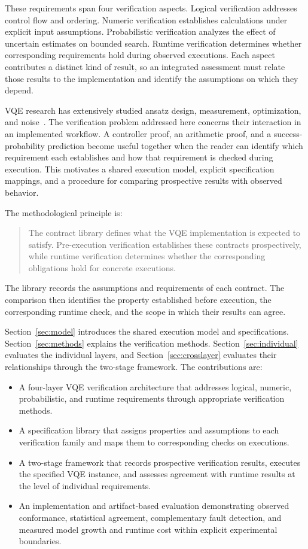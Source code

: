 \documentclass[conference]{IEEEtran}
\begin{document}
These requirements span four verification aspects. Logical verification addresses control flow and ordering. Numeric verification establishes calculations under explicit input assumptions. Probabilistic verification analyzes the effect of uncertain estimates on bounded search. Runtime verification determines whether corresponding requirements hold during observed executions. Each aspect contributes a distinct kind of result, so an integrated assessment must relate those results to the implementation and identify the assumptions on which they depend.

VQE research has extensively studied ansatz design, measurement, optimization, and noise~\cite{tilly2022}. The verification problem addressed here concerns their interaction in an implemented workflow. A controller proof, an arithmetic proof, and a success-probability prediction become useful together when the reader can identify which requirement each establishes and how that requirement is checked during execution. This motivates a shared execution model, explicit specification mappings, and a procedure for comparing prospective results with observed behavior.

The methodological principle is:
\begin{quote}
The contract library defines what the VQE implementation is expected to satisfy. Pre-execution verification establishes these contracts prospectively, while runtime verification determines whether the corresponding obligations hold for concrete executions.
\end{quote}
The library records the assumptions and requirements of each contract. The comparison then identifies the property established before execution, the corresponding runtime check, and the scope in which their results can agree.

Section~\ref{sec:model} introduces the shared execution model and specifications. Section~\ref{sec:methods} explains the verification methods. Section~\ref{sec:individual} evaluates the individual layers, and Section~\ref{sec:crosslayer} evaluates their relationships through the two-stage framework. The contributions are:
\begin{itemize}
\item A four-layer VQE verification architecture that addresses logical, numeric, probabilistic, and runtime requirements through appropriate verification methods.
\item A specification library that assigns properties and assumptions to each verification family and maps them to corresponding checks on executions.
\item A two-stage framework that records prospective verification results, executes the specified VQE instance, and assesses agreement with runtime results at the level of individual requirements.
\item An implementation and artifact-based evaluation demonstrating observed conformance, statistical agreement, complementary fault detection, and measured model growth and runtime cost within explicit experimental boundaries.
\end{itemize}
\end{document}
